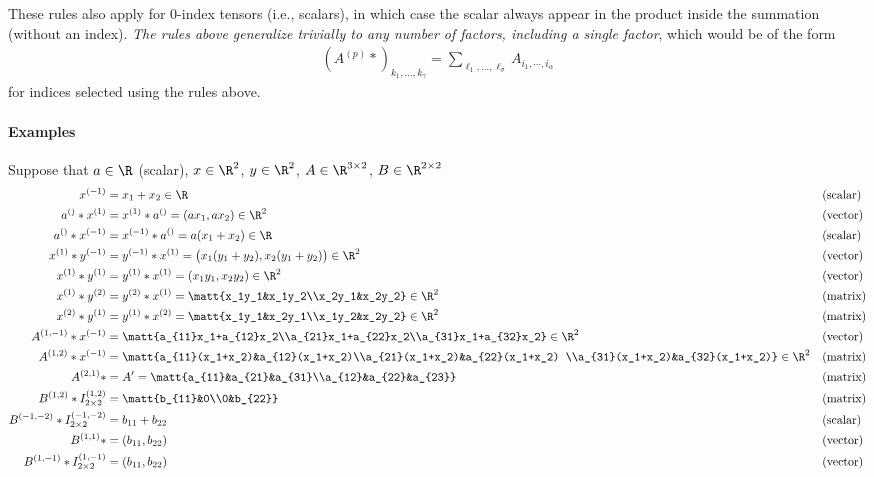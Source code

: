 \documentclass[11pt]{article}
\theoremstyle{remark}
\begin{document}
These rules also apply for $0$-index tensors (i.e., scalars), in which
case the scalar always appear in the product inside the summation
(without an index). \emph{The rules above generalize trivially to any
  number of factors, including a single factor}, which would be of the form
\begin{align*}
  (A^{(p)} * )_{k_1,\dots,k_\gamma}=\sum_{\ell_1,\dots,\ell_\sigma} A_{i_1,\cdots,i_\alpha} 
\end{align*}
for indices selected using the rules above.

\paragraph{Examples}

Suppose that $a\in\R$ (scalar), $x\in\R^2$, $y\in\R^2$, $A\in\R^{3\times 2}$, $B\in\R^{2\times 2}$
\begin{align*}
  x^{(-1)} &= x_1+x_2\in\R && \text{(scalar)}\\
  a^{()} * x^{(1)} &= x^{(1)} * a^{()} =(a x_1, a x_2) \in \R^2 && \text{(vector)}\\
  a^{()} * x^{(-1)} &= x^{(-1)} * a^{()} = a (x_1+x_2) \in\R && \text{(scalar)}\\
  x^{(1)} * y^{(-1)} &= y^{(-1)} * x^{(1)} =\big(x_1 (y_1+y_2), x_2 (y_1+y_2)\big) \in\R^2 && \text{(vector)}\\
  x^{(1)} * y^{(1)} &= y^{(1)} * x^{(1)} =(x_1 y_1, x_2 y_2) \in\R^2 && \text{(vector)}\\
  x^{(1)} * y^{(2)} &= y^{(2)} * x^{(1)}=\matt{x_1y_1&x_1y_2\\x_2y_1&x_2y_2} \in\R^2 && \text{(matrix)}\\
  x^{(2)} * y^{(1)} &=  y^{(1)} * x^{(2)}=\matt{x_1y_1&x_2y_1\\x_1y_2&x_2y_2} \in\R^2 && \text{(matrix)}\\
  A^{(1,-1)} * x^{(-1)} &= \matt{a_{11}x_1+a_{12}x_2\\a_{21}x_1+a_{22}x_2\\a_{31}x_1+a_{32}x_2}\in\R^2 &&\text{(vector)}\\
  A^{(1,2)} * x^{(-1)} &= \matt{a_{11}(x_1+x_2)&a_{12}(x_1+x_2)\\a_{21}(x_1+x_2)&a_{22}(x_1+x_2) \\a_{31}(x_1+x_2)&a_{32}(x_1+x_2)}\in\R^2&& \text{(matrix)}\\
  A^{(2,1)} * &= A'=\matt{a_{11}&a_{21}&a_{31}\\a_{12}&a_{22}&a_{23}}&& \text{(matrix)}\\
  B^{(1,2)} * I_{2\times 2}^{(1,2)}&=\matt{b_{11}&0\\0&b_{22}}&& \text{(matrix)}\\
  B^{(-1,-2)} * I_{2\times 2}^{(-1,-2)}&=b_{11}+b_{22}&& \text{(scalar)}\\
  B^{(1,1)} * &= (b_{11},b_{22}) && \text{(vector)}\\
  B^{(1,-1)} * I_{2\times 2}^{(1,-1)}&=(b_{11},b_{22}) && \text{(vector)}\\
\end{align*}
\end{document}
